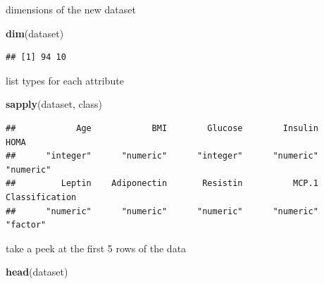 \documentclass[]{book}
\newenvironment{Shaded}{\begin{snugshade}}{\end{snugshade}}
\newcommand{\CommentTok}[1]{\textcolor[rgb]{0.56,0.35,0.01}{\textit{#1}}}
\newcommand{\DataTypeTok}[1]{\textcolor[rgb]{0.13,0.29,0.53}{#1}}
\newcommand{\FloatTok}[1]{\textcolor[rgb]{0.00,0.00,0.81}{#1}}
\newcommand{\KeywordTok}[1]{\textcolor[rgb]{0.13,0.29,0.53}{\textbf{#1}}}
\newcommand{\NormalTok}[1]{#1}
\newcommand{\OperatorTok}[1]{\textcolor[rgb]{0.81,0.36,0.00}{\textbf{#1}}}
\newcommand{\OtherTok}[1]{\textcolor[rgb]{0.56,0.35,0.01}{#1}}
\newcommand{\StringTok}[1]{\textcolor[rgb]{0.31,0.60,0.02}{#1}}
\begin{document}
\begin{Shaded}
\end{Shaded}

dimensions of the new dataset

\begin{Shaded}
\begin{Highlighting}[]
\KeywordTok{dim}\NormalTok{(dataset)}
\end{Highlighting}
\end{Shaded}

\begin{verbatim}
## [1] 94 10
\end{verbatim}

list types for each attribute

\begin{Shaded}
\begin{Highlighting}[]
\KeywordTok{sapply}\NormalTok{(dataset, class)}
\end{Highlighting}
\end{Shaded}

\begin{verbatim}
##            Age            BMI        Glucose        Insulin           HOMA 
##      "integer"      "numeric"      "integer"      "numeric"      "numeric" 
##         Leptin    Adiponectin       Resistin          MCP.1 Classification 
##      "numeric"      "numeric"      "numeric"      "numeric"       "factor"
\end{verbatim}

take a peek at the first 5 rows of the data

\begin{Shaded}
\begin{Highlighting}[]
\KeywordTok{head}\NormalTok{(dataset)}
\end{Highlighting}
\end{Shaded}
\end{document}

